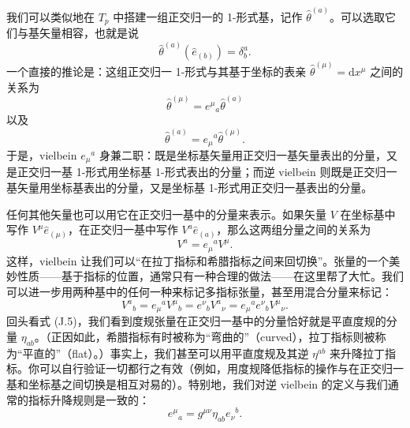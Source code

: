 我们可以类似地在 $T_{p}$ 中搭建一组正交归一的 1-形式基，记作 $\hat{\theta}^{(a)}$。可以选取它们与基矢量相容，也就是说
\begin{equation*}
\hat{\theta}^{(a)}(\hat{e}_{(b)}) = \delta^{a}_{b}.
\tag{J.7}
\end{equation*}
一个直接的推论是：这组正交归一 1-形式与其基于坐标的表亲 $\hat{\theta}^{(\mu)} = \mathrm{d}x^{\mu}$ 之间的关系为
\begin{equation*}
\hat{\theta}^{(\mu)} = e^{\mu}{}_{a}\hat{\theta}^{(a)}
\tag{J.8}
\end{equation*}
以及
\begin{equation*}
\hat{\theta}^{(a)} = e_{\mu}{}^{a}\hat{\theta}^{(\mu)}.
\tag{J.9}
\end{equation*}
于是，vielbein $e_{\mu}{}^{a}$ 身兼二职：既是坐标基矢量用正交归一基矢量表出的分量，又是正交归一基 1-形式用坐标基 1-形式表出的分量；而逆 vielbein 则既是正交归一基矢量用坐标基表出的分量，又是坐标基 1-形式用正交归一基表出的分量。

任何其他矢量也可以用它在正交归一基中的分量来表示。如果矢量 $V$ 在坐标基中写作 $V^{\mu}\hat{e}_{(\mu)}$，在正交归一基中写作 $V^{a}\hat{e}_{(a)}$，那么这两组分量之间的关系为
\begin{equation*}
V^{a} = e_{\mu}{}^{a}V^{\mu}.
\tag{J.10}
\end{equation*}
这样，vielbein 让我们可以“在拉丁指标和希腊指标之间来回切换”。张量的一个美妙性质——基于指标的位置，通常只有一种合理的做法——在这里帮了大忙。我们可以进一步用两种基中的任何一种来标记多指标张量，甚至用混合分量来标记：
\begin{equation*}
V^{a}{}_{b} = e_{\mu}{}^{a}V^{\mu}{}_{b} = e^{\nu}{}_{b}V^{a}{}_{\nu} = e_{\mu}{}^{a}e^{\nu}{}_{b}V^{\mu}{}_{\nu}.
\tag{J.11}
\end{equation*}
回头看式 (J.5)，我们看到度规张量在正交归一基中的分量恰好就是平直度规的分量 $\eta_{ab}$。（正因如此，希腊指标有时被称为“弯曲的”（curved），拉丁指标则被称为“平直的”（flat）。）事实上，我们甚至可以用平直度规及其逆 $\eta^{ab}$ 来升降拉丁指标。你可以自行验证一切都行之有效（例如，用度规降低指标的操作与在正交归一基和坐标基之间切换是相互对易的）。特别地，我们对逆 vielbein 的定义与我们通常的指标升降规则是一致的：
\begin{equation*}
e^{\mu}{}_{a} = g^{\mu\nu}\eta_{ab}e_{\nu}{}^{b}.
\tag{J.12}
\end{equation*}

